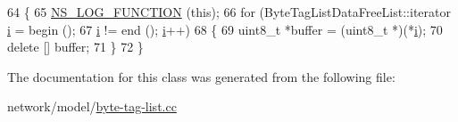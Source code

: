 \begin{DoxyCode}
64 \{
65   \hyperlink{log-macros-disabled_8h_a90b90d5bad1f39cb1b64923ea94c0761}{NS\_LOG\_FUNCTION} (\textcolor{keyword}{this});
66   \textcolor{keywordflow}{for} (ByteTagListDataFreeList::iterator \hyperlink{bernuolliDistribution_8m_a6f6ccfcf58b31cb6412107d9d5281426}{i} = begin ();
67        \hyperlink{bernuolliDistribution_8m_a6f6ccfcf58b31cb6412107d9d5281426}{i} != end (); \hyperlink{bernuolliDistribution_8m_a6f6ccfcf58b31cb6412107d9d5281426}{i}++)
68     \{
69       uint8\_t *buffer = (uint8\_t *)(*\hyperlink{bernuolliDistribution_8m_a6f6ccfcf58b31cb6412107d9d5281426}{i});
70       \textcolor{keyword}{delete} [] buffer;
71     \}
72 \}
\end{DoxyCode}


The documentation for this class was generated from the following file\+:\begin{DoxyCompactItemize}
\item 
network/model/\hyperlink{byte-tag-list_8cc}{byte-\/tag-\/list.\+cc}\end{DoxyCompactItemize}

